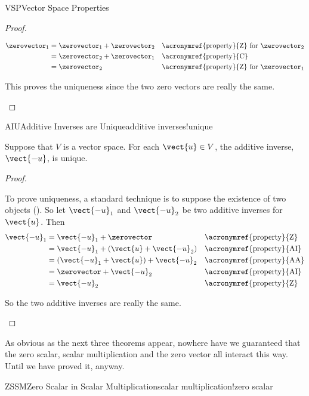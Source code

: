 \begin{subsect}{VSP}{Vector Space Properties}
\begin{proof}
\begin{para}
%
\begin{align*}
\zerovector_1
&=\zerovector_1+\zerovector_2
&&\text{\acronymref{property}{Z} for $\zerovector_2$}\\
%
&=\zerovector_2+\zerovector_1
&&\text{\acronymref{property}{C}}\\
%
&=\zerovector_2
&&\text{\acronymref{property}{Z} for $\zerovector_1$}
%
\end{align*}
\end{para}
%
\begin{para}This proves the uniqueness since the two zero vectors are really the same.\end{para}
%
\end{proof}
%
\begin{theorem}{AIU}{Additive Inverses are Unique}{additive inverses!unique}
%
\begin{para}Suppose that $V$ is a vector space.   For each $\vect{u}\in V$, the additive inverse, $\vect{-u}$, is unique.\end{para}
%
\end{theorem}
%
\begin{proof}
\begin{para}To prove uniqueness, a standard technique is to suppose the existence of two objects ().  So let $\vect{-u}_1$ and $\vect{-u}_2$ be two additive inverses for $\vect{u}$.  Then
%
\begin{align*}
\vect{-u}_1&=\vect{-u}_1+\zerovector&&\text{\acronymref{property}{Z}}\\
&=\vect{-u}_1+(\vect{u}+\vect{-u}_2)&&\text{\acronymref{property}{AI}}\\
&=(\vect{-u}_1+\vect{u})+\vect{-u}_2&&\text{\acronymref{property}{AA}}\\
&=\zerovector+\vect{-u}_2&&\text{\acronymref{property}{AI}}\\
&=\vect{-u}_2&&\text{\acronymref{property}{Z}}
\end{align*}\end{para}
%
\begin{para}So the two additive inverses are really the same.\end{para}
\end{proof}
%
\begin{para}As obvious as the next three theorems appear, nowhere have we guaranteed that the zero scalar, scalar multiplication and the zero vector all interact this way.  Until we have proved it, anyway.\end{para}
%
\begin{theorem}{ZSSM}{Zero Scalar in Scalar Multiplication}{scalar multiplication!zero scalar}

\end{theorem}
\end{subsect}
